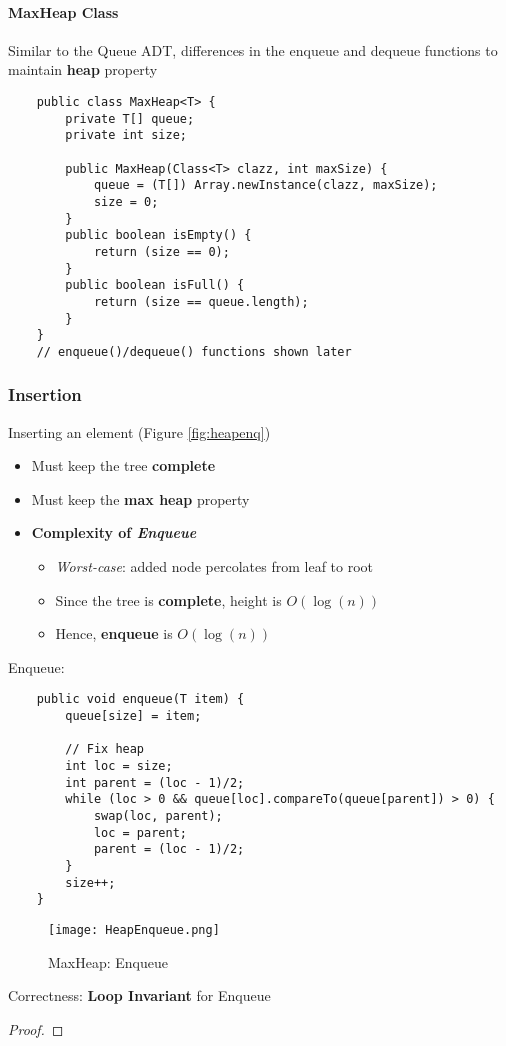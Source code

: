 \documentclass[10pt, 
a4paper, 
oneside, 
headinclude, footinclude, 
BCOR5mm]
{scrartcl}
\begin{document}
\paragraph{\textbf{MaxHeap Class}}
Similar to the Queue ADT, differences in the enqueue and dequeue functions to maintain \textbf{heap} property
\begin{lstlisting}
    public class MaxHeap<T> {
        private T[] queue;
        private int size;

        public MaxHeap(Class<T> clazz, int maxSize) {
            queue = (T[]) Array.newInstance(clazz, maxSize);
            size = 0;
        }
        public boolean isEmpty() {
            return (size == 0);
        }
        public boolean isFull() {
            return (size == queue.length);
        }
    }
    // enqueue()/dequeue() functions shown later
\end{lstlisting}

\subsubsection{Insertion}
\begin{definition}
    Inserting an element (Figure \vref{fig:heapenq})
    \begin{itemize}
        \item Must keep the tree \textbf{complete}
        \item Must keep the \textbf{max heap} property
        \item \textbf{Complexity of \textit{Enqueue}}
        \begin{itemize}
            \item \textit{Worst-case}: added node percolates from leaf to root
            \item Since the tree is \textbf{complete}, height is $O(\log(n))$
            \item Hence, \textbf{enqueue} is $O(\log(n))$
        \end{itemize}
    \end{itemize}
\end{definition}
Enqueue:
\begin{lstlisting}
    public void enqueue(T item) {
        queue[size] = item;

        // Fix heap
        int loc = size;
        int parent = (loc - 1)/2;
        while (loc > 0 && queue[loc].compareTo(queue[parent]) > 0) {
            swap(loc, parent);
            loc = parent;
            parent = (loc - 1)/2;
        }
        size++;
    }
\end{lstlisting}
\begin{figure}[H]
    \begin{center}
        \texttt{[image: HeapEnqueue.png]}
        \caption{MaxHeap: Enqueue}
        \label{fig:heapenq}
    \end{center}
\end{figure}
Correctness: \textbf{Loop Invariant} for Enqueue
\begin{proof}
        
\end{proof}
\newpage
\end{document}
